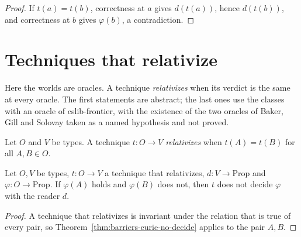 \begin{proof}
  \leanok
  If $t(a) = t(b)$, correctness at $a$ gives $d(t(a))$, hence $d(t(b))$, and correctness at $b$
  gives $\varphi(b)$, a contradiction.
\end{proof}

\section{Techniques that relativize}
\label{sec:barriers-relativization}

Here the worlds are oracles. A technique \emph{relativizes} when its verdict is the same at every
oracle. The first statements are abstract; the last ones use the classes with an oracle of
cslib-frontier, with the existence of the two oracles of Baker, Gill and Solovay taken as a named
hypothesis and not proved.

\begin{definition}
  \label{def:barriers-relativiza}
  \leanok
  Let $O$ and $V$ be types. A technique $t : O \to V$ \emph{relativizes} when $t(A) = t(B)$ for all
  $A, B \in O$.
  \own{}
\end{definition}

\begin{theorem}
  \label{thm:barriers-relativiza-no-decide}
  \leanok
  Let $O, V$ be types, $t : O \to V$ a technique that relativizes, $d : V \to \mathrm{Prop}$ and
  $\varphi : O \to \mathrm{Prop}$. If $\varphi(A)$ holds and $\varphi(B)$ does not, then $t$ does
  not decide $\varphi$ with the reader $d$.
  \own{}
\end{theorem}

\begin{proof}
  \leanok
  A technique that relativizes is invariant under the relation that is true of every pair, so
  Theorem~\ref{thm:barriers-curie-no-decide} applies to the pair $A, B$.
\end{proof}

